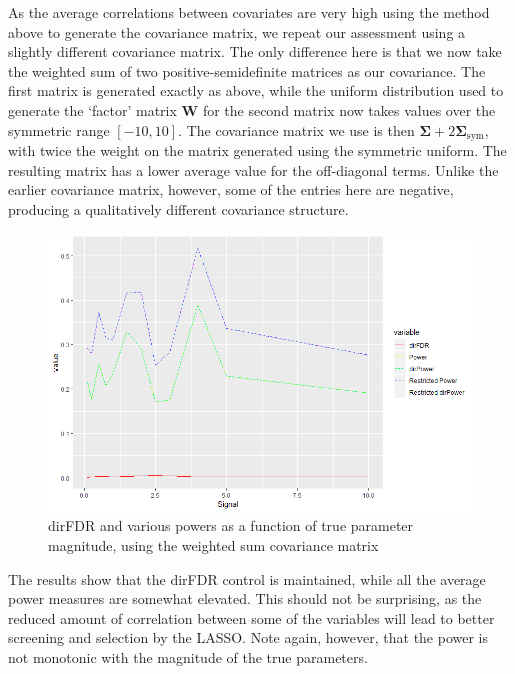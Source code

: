 \documentclass[]{scrartcl}
\newcommand{\1}[1]{\mathbbm{1}_{\left\{#1\right\}}}
\begin{document}
As the average correlations between covariates are very high using the method above to generate the covariance matrix, we repeat our assessment using a slightly different covariance matrix. The only difference here is that we now take the weighted sum of two positive-semidefinite matrices as our covariance. The first matrix is generated exactly as above, while the uniform distribution used to generate the `factor' matrix $\mathbf{W}$ for the second matrix now takes values over the symmetric range $[-10, 10]$. The covariance matrix we use is then $\mathbf{\Sigma} + 2\mathbf{\Sigma}_{\text{sym}}$, with twice the weight on the matrix generated using the symmetric uniform. The resulting matrix has a lower average value for the off-diagonal terms. Unlike the earlier covariance matrix, however, some of the entries here are negative, producing a qualitatively different covariance structure. 

\begin{figure}[h]
	\centering
	\includegraphics[width=\textwidth]{results_mixedcv}
	\caption{dirFDR and various powers as a function of true parameter magnitude, using the weighted sum covariance matrix}
\end{figure}
The results show that the dirFDR control is maintained, while all the average power measures are somewhat elevated. This should not be surprising, as the reduced amount of correlation between some of the variables will lead to better screening and selection by the LASSO. Note again, however, that the power is not monotonic with the magnitude of the true parameters. 
\end{document}
